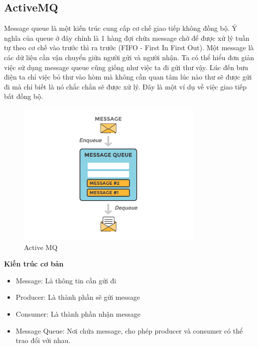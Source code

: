             \subsection{ActiveMQ}
            
            Message queue\cite{MesssageQueue} là một kiến trúc cung cấp cơ chế giao tiếp không đồng bộ. Ý nghĩa của queue ở đây chính là 1 hàng đợi chứa message chờ để được xử lý tuần tự theo cơ chế vào trước thì ra trước (FIFO - First In First Out). Một message là các dữ liệu cần vận chuyển giữa người gửi và người nhận. Ta có thể hiểu đơn giản việc sử dụng message queue cũng giống như việc ta đi gửi thư vậy. Lúc đến bưu điện ta chỉ việc bỏ thư vào hòm mà không cần quan tâm lúc nào thư sẽ được gửi đi mà chỉ biết là nó chắc chắn sẽ được xử lý. Đây là một ví dụ về việc giao tiếp bất đồng bộ.
            
             \begin{figure}[H]   			\includegraphics[width=0.8\textwidth]{Images/message.png}
			\centering
			\linebreak
			\caption{Active MQ\cite{activeMQ}}
	        \end{figure}
		        
            \textbf{Kiến trúc cơ bản}
            
            \begin{itemize}
                \item Message: Là thông tin cần gửi đi
                \item Producer: Là thành phần sẽ gửi message
                \item Consumer: Là thành phần nhận message
                \item Message Queue: Nơi chứa message, cho phép producer và consumer có thể trao đổi với nhau.
            \end{itemize}
            
